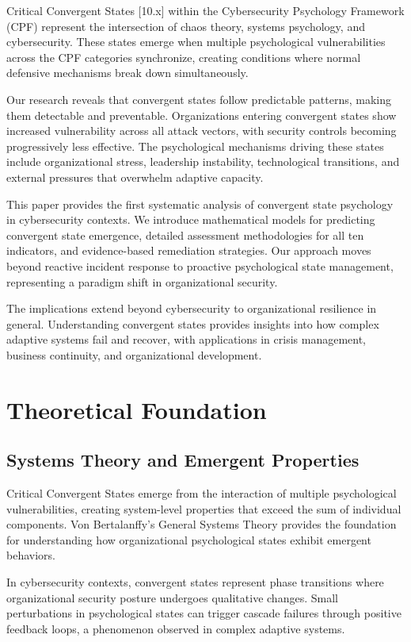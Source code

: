 \documentclass[11pt,a4paper]{article}
\begin{document}
Critical Convergent States [10.x] within the Cybersecurity Psychology Framework (CPF) represent the intersection of chaos theory, systems psychology, and cybersecurity. These states emerge when multiple psychological vulnerabilities across the CPF categories synchronize, creating conditions where normal defensive mechanisms break down simultaneously.

Our research reveals that convergent states follow predictable patterns, making them detectable and preventable. Organizations entering convergent states show increased vulnerability across all attack vectors, with security controls becoming progressively less effective. The psychological mechanisms driving these states include organizational stress, leadership instability, technological transitions, and external pressures that overwhelm adaptive capacity.

This paper provides the first systematic analysis of convergent state psychology in cybersecurity contexts. We introduce mathematical models for predicting convergent state emergence, detailed assessment methodologies for all ten indicators, and evidence-based remediation strategies. Our approach moves beyond reactive incident response to proactive psychological state management, representing a paradigm shift in organizational security.

The implications extend beyond cybersecurity to organizational resilience in general. Understanding convergent states provides insights into how complex adaptive systems fail and recover, with applications in crisis management, business continuity, and organizational development.

\section{Theoretical Foundation}

\subsection{Systems Theory and Emergent Properties}

Critical Convergent States emerge from the interaction of multiple psychological vulnerabilities, creating system-level properties that exceed the sum of individual components. Von Bertalanffy's\cite{bertalanffy1968} General Systems Theory provides the foundation for understanding how organizational psychological states exhibit emergent behaviors.

In cybersecurity contexts, convergent states represent phase transitions where organizational security posture undergoes qualitative changes. Small perturbations in psychological states can trigger cascade failures through positive feedback loops, a phenomenon observed in complex adaptive systems\cite{holland1995}.
\end{document}

